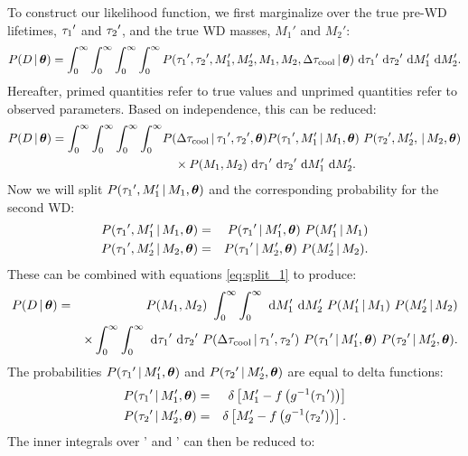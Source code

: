 \documentclass[12pt,preprint]{hackaastex}
\begin{document}
To construct our likelihood function, we first marginalize over the true pre-WD lifetimes, $\ta'$ and $\tb'$, and the true WD masses, $M_1'$ and $M_2'$:
\begin{equation}
P(D \given \bs{\theta}) = \int_0^{\infty}\int_0^{\infty} \int_0^{\infty} \int_0^{\infty} P(\ta', \tb', M_1', M_2', M_1, M_2, \Delta \tauc \given \bs{\theta}) ~\der \ta' ~\der \tb' ~\der M_1' ~\der M_2' .
\end{equation}
Hereafter, primed quantities refer to true values and unprimed quantities refer to observed parameters. Based on independence, this can be reduced:
\begin{eqnarray}
P(D \given \bs{\theta}) = \int_0^{\infty}\int_0^{\infty} \int_0^{\infty} \int_0^{\infty} & P(\Delta \tauc \given \ta', \tb', \bs{\theta})  P(\ta', M_1'  \given M_1, \bs{\theta}) ~P(\tb', M_2', \given M_2, \bs{\theta}) \nonumber \\ 
 & \quad{} \times P(M_1, M_2) ~\der \ta' ~\der \tb' ~\der M_1' ~\der M_2'.  \label{eq:split_1}
\end{eqnarray}
Now we will split $P(\ta', M_1'  \given M_1, \bs{\theta})$ and the corresponding probability for the second WD:
\begin{eqnarray}
P(\ta', M_1'  \given M_1, \bs{\theta}) &=& P(\ta' \given M_1', \bs{\theta}) ~P(M_1' \given M_1) \\
P(\ta', M_2'  \given M_2, \bs{\theta}) &=& P(\ta' \given M_2', \bs{\theta}) ~P(M_2' \given M_2). 
\end{eqnarray}
These can be combined with equations \ref{eq:split_1} to produce:
\begin{eqnarray}
P(D \given \bs{\theta}) &=& P(M_1, M_2) ~\int_0^{\infty}\int_0^{\infty} ~\der M_1' ~\der M_2' ~P(M_1' \given M_1) ~P(M_2' \given M_2) \nonumber \\
&& \times \int_0^{\infty} \int_0^{\infty} ~\der \ta' ~\der \tb'  ~P(\Delta \tauc \given \ta', \tb') ~P(\ta' \given M_1', \bs{\theta})  ~P(\tb' \given M_2', \bs{\theta}) .  \label{eq:split_2}
\end{eqnarray}
The probabilities $P(\ta' \given M_1', \bs{\theta})$ and $P(\tb' \given M_2', \bs{\theta})$ are equal to delta functions:
\begin{eqnarray}
P(\ta' \given M_1', \bs{\theta}) &=& \delta \left[ M_1' - f \left( g^{-1}(\ta') \right) \right] \\
P(\tb' \given M_2', \bs{\theta}) &=& \delta \left[ M_2' - f \left( g^{-1}(\tb') \right) \right].
\end{eqnarray}
The inner integrals over \ta' and \tb' can then be reduced to:
\end{document}

